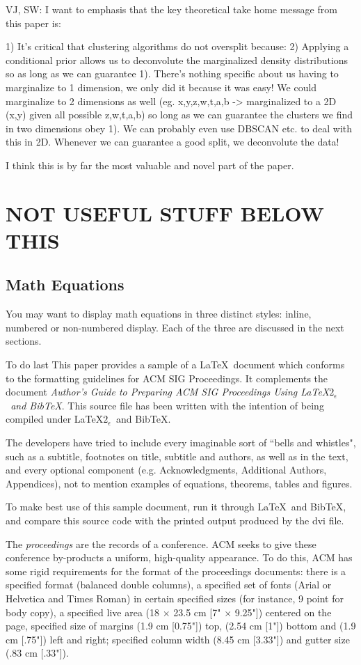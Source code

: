 \documentclass{acm_proc_article-sp}
\begin{document}
VJ, SW: I want to emphasis that the key theoretical take home message from this paper is:

1) It's critical that clustering algorithms do not oversplit because:
2) Applying a conditional prior allows us to deconvolute the marginalized density distributions so as long as we can guarantee 1). There's nothing specific about us having to marginalize to 1 dimension, we only did it because it was easy! We could marginalize to 2 dimensions as well (eg. x,y,z,w,t,a,b -> marginalized to a 2D (x,y) given all possible z,w,t,a,b) so long as we can guarantee the clusters we find in two dimensions obey 1). We can probably even use DBSCAN etc. to deal with this in 2D. Whenever we can guarantee a good split, we deconvolute the data!

I think this is by far the most valuable and novel part of the paper. 

\section{NOT USEFUL STUFF BELOW THIS}

\subsection{Math Equations}
You may want to display math equations in three distinct styles:
inline, numbered or non-numbered display.  Each of
the three are discussed in the next sections.

To do last
This paper provides a sample of a \LaTeX\ document which conforms to
the formatting guidelines for ACM SIG Proceedings.
It complements the document \textit{Author's Guide to Preparing
ACM SIG Proceedings Using \LaTeX$2_\epsilon$\ and Bib\TeX}. This
source file has been written with the intention of being
compiled under \LaTeX$2_\epsilon$\ and BibTeX.

The developers have tried to include every imaginable sort
of ``bells and whistles", such as a subtitle, footnotes on
title, subtitle and authors, as well as in the text, and
every optional component (e.g. Acknowledgments, Additional
Authors, Appendices), not to mention examples of
equations, theorems, tables and figures.

To make best use of this sample document, run it through \LaTeX\
and BibTeX, and compare this source code with the printed
output produced by the dvi file.


The \textit{proceedings} are the records of a conference.
ACM seeks to give these conference by-products a uniform,
high-quality appearance.  To do this, ACM has some rigid
requirements for the format of the proceedings documents: there
is a specified format (balanced  double columns), a specified
set of fonts (Arial or Helvetica and Times Roman) in
certain specified sizes (for instance, 9 point for body copy),
a specified live area (18 $\times$ 23.5 cm [7" $\times$ 9.25"]) centered on
the page, specified size of margins (1.9 cm [0.75"]) top, (2.54 cm [1"]) bottom
and (1.9 cm [.75"]) left and right; specified column width
(8.45 cm [3.33"]) and gutter size (.83 cm [.33"]).
\end{document}
